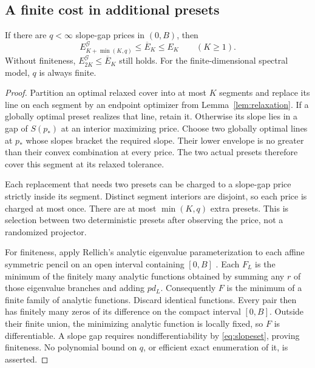 \subsection{A finite cost in additional presets}
\begin{theorem}\label{thm:repair}
If there are $q<\infty$ slope-gap prices in $(0,B)$, then
\begin{equation}\label{eq:repair}
 E_{K+\min(K,q)}^{\mathcal G}\le\overline E_K\le E_K
 \qquad(K\ge1).
\end{equation}
Without finiteness, $E_{2K}^{\mathcal G}\le\overline E_K$ still holds.
For the finite-dimensional spectral model, $q$ is always finite.
\end{theorem}
\begin{proof}
Partition an optimal relaxed cover into at most $K$ segments and replace
its line on each segment by an endpoint optimizer from
Lemma~\ref{lem:relaxation}. If a globally optimal preset realizes that
line, retain it. Otherwise its slope lies in a gap of $S(p_*)$ at an
interior maximizing price. Choose two globally optimal lines at $p_*$
whose slopes bracket the required slope. Their lower envelope is no
greater than their convex combination at every price. The two actual
presets therefore cover this segment at its relaxed tolerance.

Each replacement that needs two presets can be charged to a slope-gap
price strictly inside its segment. Distinct segment interiors are
disjoint, so each price is charged at most once. There are at most
$\min(K,q)$ extra presets. This is selection between two deterministic
presets after observing the price, not a randomized projector.

For finiteness, apply Rellich's analytic eigenvalue parameterization to
each affine symmetric pencil on an open interval containing $[0,B]$
\cite[Theorem~1.1]{barbarino2022}. Each $F_L$ is the minimum of the
finitely many analytic functions obtained by summing any $r$ of those
eigenvalue branches and adding $pd_L$. Consequently $F$ is the minimum
of a finite family of analytic functions. Discard identical functions.
Every pair then has finitely many zeros of its difference on the compact
interval $[0,B]$. Outside their finite union, the minimizing analytic
function is locally fixed, so $F$ is differentiable. A slope gap
requires nondifferentiability by \eqref{eq:slopeset}, proving finiteness.
No polynomial bound on $q$, or efficient exact enumeration of it, is
asserted.
\end{proof}

